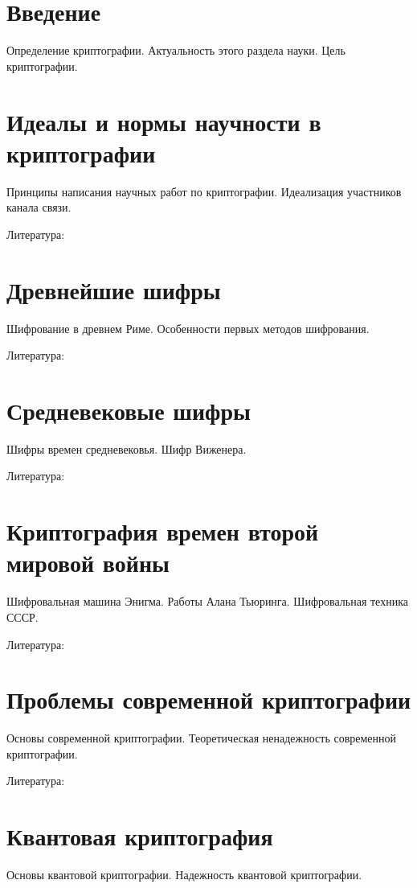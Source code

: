 





\section*{Введение}
Определение криптографии. Актуальность этого раздела науки. Цель криптографии.

\section{Идеалы и нормы научности в криптографии}
Принципы написания научных работ по криптографии. Идеализация участников канала связи.

Литература: \cite{phil2016nesm, scarani2004quantum}

\section{Древнейшие шифры}
Шифрование в древнем Риме. Особенности первых методов шифрования. 

Литература: \cite{senthil2013modern}

\section{Средневековые шифры}
Шифры времен средневековья. Шифр Виженера. 

Литература: \cite{omran2011cryptanalytic}

\section{Криптография времен второй мировой войны}
Шифровальная машина Энигма. Работы Алана Тьюринга. Шифровальная техника СССР.

Литература: \cite{d2006sov, g2005n, hodges2014alan}


\section{Проблемы современной криптографии}
Основы современной криптографии. Теоретическая ненадежность современной криптографии.

Литература: \cite{bellare2005introduction}

\section{Квантовая криптография}
Основы квантовой криптографии. Надежность квантовой криптографии.

